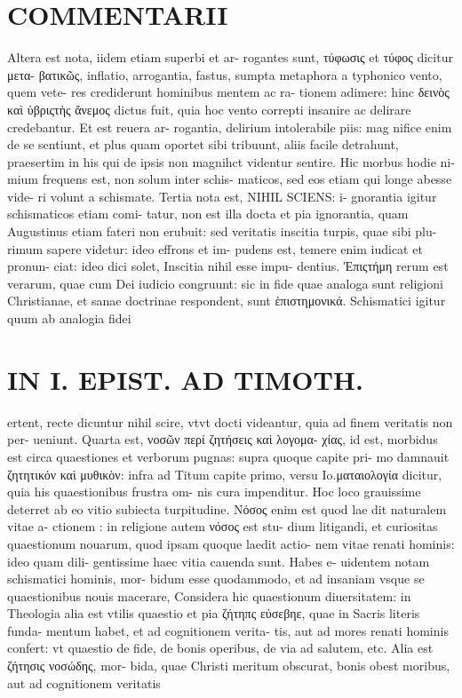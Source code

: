 \documentclass{article}
\begin{document}
\begin{pages}
\section*{COMMENTARII }
\marginpar{[ p.150 ]}\pstart Altera est nota, iidem etiam superbi et ar- rogantes sunt, τύφωσις et τύφος dicitur  μετα- βατικῶς, inflatio, arrogantia, fastus, sumpta metaphora a typhonico vento, quem vete- res crediderunt hominibus mentem ac ra- tionem adimere: hinc δεινὸς καὶ ὑβριςτὴς ἄνεμος dictus fuit, quia hoc vento correpti insanire ac delirare credebantur. Et est reuera ar- rogantia, delirium intolerabile piis: mag nifice enim de se sentiunt, et plus quam oportet sibi tribuunt, aliis facile detrahunt, praesertim in his qui de ipsis non magnihct videntur sentire. Hic morbus hodie ni- mium frequens est, non solum inter schis- maticos, sed eos etiam qui longe abesse vide- ri volunt a schismate.  \pend\pstart Tertia nota est, NIHIL SCIENS: i- gnorantia igitur schismaticos etiam comi- tatur, non est illa docta et pia ignorantia, quam Augustinus etiam fateri non erubuit: sed veritatis inscitia turpis, quae sibi plu- rimum sapere videtur: ideo effrons et im- pudens est, temere enim iudicat et pronun- ciat: ideo dici solet, Inscitia nihil esse impu- dentius. Ἐπιςτήμη rerum est verarum, quae cum Dei iudicio congruunt: sic in fide quae analoga sunt religioni Christianae, et sanae doctrinae respondent, sunt ἑπιστημονικά. Schismatici igitur quum ab analogia fidei  \pend
\section*{IN I. EPIST. AD TIMOTH. }
\marginpar{[ p.151 ]}\pstart ertent, recte dicuntur nihil scire, vtvt docti videantur, quia ad finem veritatis non per- ueniunt.  \pend\pstart Quarta est, νοσῶν περί ζητήσεις καὶ λογομα- χίας, id est, morbidus est circa quaestiones et verborum pugnas: supra quoque capite pri- mo damnauit ζητητικόν καὶ μυθικὸν: infra ad Titum capite primo, versu Io.ματαιολογία dicitur, quia his quaestionibus frustra om- nis cura impenditur. Hoc loco grauissime deterret ab eo vitio subiecta turpitudine. Νόσος  enim est quod lae dit naturalem vitae a- ctionem : in religione autem νόσος est stu- dium litigandi, et curiositas quaestionum nouarum, quod ipsam quoque laedit actio- nem vitae renati hominis: ideo quam dili- gentissime haec vitia cauenda sunt. Habes e- uidentem notam schismatici hominis, mor- bidum esse quodammodo, et ad insaniam vsque se quaestionibus nouis macerare, Considera hic quaestionum diuersitatem: in Theologia alia est vtilis quaestio et pia ζήτηπς εὐσεβηε, quae in Sacris literis funda- mentum habet, et ad cognitionem verita- tis, aut ad mores renati hominis confert: vt quaestio de fide, de bonis operibus, de via ad salutem, etc. Alia est ζήτησις νοσώδης, mor- bida, quae Christi meritum obscurat, bonis obest moribus, aut ad cognitionem veritatis  \pend

\end{pages}
\end{document}
